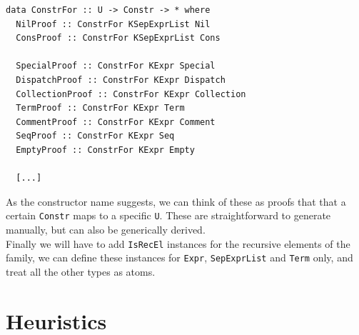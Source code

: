 \documentclass[11pt, titlepage]{article}
\newcommand{\toHaskell}[1]{\texttt{#1}\xspace}
\begin{document}
\begin{verbatim}
data ConstrFor :: U -> Constr -> * where
  NilProof :: ConstrFor KSepExprList Nil
  ConsProof :: ConstrFor KSepExprList Cons

  SpecialProof :: ConstrFor KExpr Special
  DispatchProof :: ConstrFor KExpr Dispatch
  CollectionProof :: ConstrFor KExpr Collection
  TermProof :: ConstrFor KExpr Term
  CommentProof :: ConstrFor KExpr Comment
  SeqProof :: ConstrFor KExpr Seq
  EmptyProof :: ConstrFor KExpr Empty
  
  [...]
\end{verbatim}

As the constructor name suggests, we can think of these as proofs that  that a certain \toHaskell{Constr} maps to a specific \toHaskell{U}. These are straightforward to generate manually, but can also be generically derived.
\\
Finally we will have to add \toHaskell{IsRecEl} instances for the recursive elements of the family, we can define these instances for \toHaskell{Expr}, \toHaskell{SepExprList} and \toHaskell{Term} only, and treat all the other types as atoms.  



\section{Heuristics}
\end{document}
